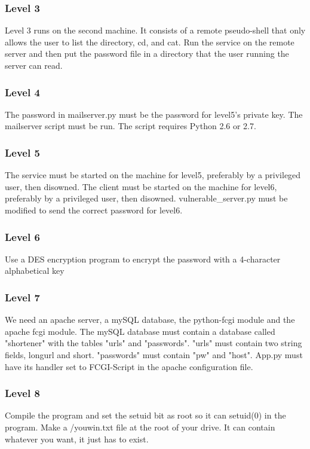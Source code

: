 \documentclass[12pt]{article}
\begin{document}
\begin{description}
\subsubsection{Level 3}
Level 3 runs on the second machine. It consists of a remote pseudo-shell that
only allows the user to list the directory, cd, and cat. Run the service on the
remote server and then put the password file in a directory that the user
running the server can read.
\subsubsection{Level 4}
The password in mailserver.py must be the password for level5's private key.
The mailserver script must be run. The script requires Python 2.6 or 2.7.
\subsubsection{Level 5}
The service must be started on the machine for level5, preferably by a privileged user, then disowned.  The client must be started on the machine for level6, preferably by a privileged user, then disowned.  vulnerable\_server.py must be modified to send the correct password for level6.
\subsubsection{Level 6}
Use a DES encryption program  to encrypt the password with a 4-character
alphabetical key
\subsubsection{Level 7}
We need an apache server, a mySQL database, the python-fcgi module and the apache fcgi module.  The mySQL database must contain a database called "shortener" with the tables "urls" and "passwords".  "urls" must contain two string fields, longurl and short.  "passwords" must contain "pw" and "host".  App.py must have its handler set to FCGI-Script in the apache configuration file.
\subsubsection{Level 8}
Compile the program and set the setuid bit as root so it can setuid(0) in the
program. Make a /youwin.txt file at the root of your drive. It can contain
whatever you want, it just has to exist.


\end{description}
\end{document}
